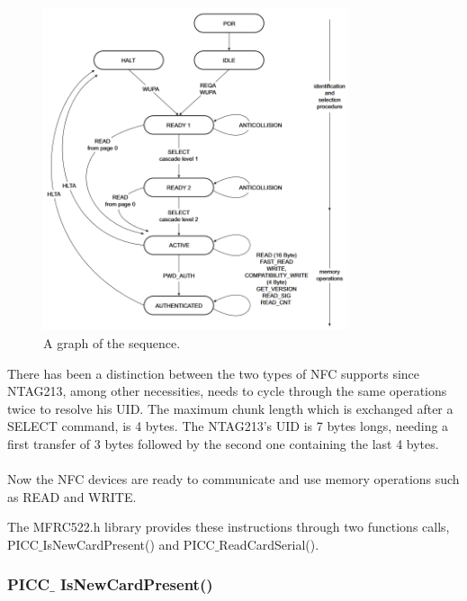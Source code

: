 \documentclass[target=bach,aauheader=,style=]{thud}
\begin{document}
\begin{figure}[h]
	\centering
	\includegraphics[width=0.80\textwidth]{nfcsequence}
	\caption{A graph of the sequence.}
	\label{fig:nfcsequence}
\end{figure} 
There has been a distinction between the two types of NFC supports since NTAG213, among other necessities, needs to cycle through the same operations twice to resolve his UID. The maximum chunk length which is exchanged after a SELECT command, is 4 bytes. The NTAG213's UID is 7 bytes longs, needing a first transfer of 3 bytes followed by the second one containing the last 4 bytes.\\ \\
Now the NFC devices are ready to communicate and use memory operations such as READ and  WRITE.

The MFRC522.h library provides these instructions through two functions calls, PICC$\_$IsNewCardPresent() and PICC$\_$ReadCardSerial().

\subsubsection{PICC$\_$ IsNewCardPresent()}
\end{document}
